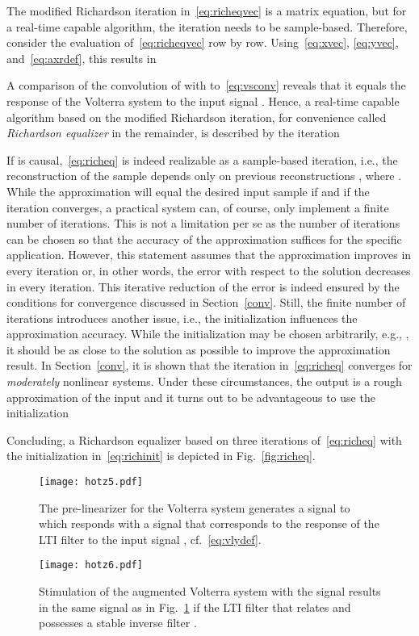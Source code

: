 \documentclass[10pt,twocolumn,twoside]{IEEEtran}
\begin{document}
The modified Richardson iteration in~\eqref{eq:richeqvec} is a matrix equation, but
for a real-time capable algorithm, the iteration needs to be sample-based. Therefore,
consider the evaluation of~\eqref{eq:richeqvec} row by row. Using~\eqref{eq:xvec},
\eqref{eq:yvec}, and~\eqref{eq:axrdef}, this results in

A comparison of the convolution of  with  to~\eqref{eq:vsconv}
reveals that it equals the response of the Volterra system  to the
input signal . Hence, a real-time capable algorithm based on the modified Richardson iteration,
for convenience called \emph{Richardson equalizer} in the remainder, is described by the
iteration

If  is causal,~\eqref{eq:richeq} is indeed realizable as a sample-based iteration,
i.e., the reconstruction  of the sample  depends only on previous
reconstructions , where . 
While the approximation  will equal the desired input sample 
if  and if the iteration converges,
a practical system can, of course, only implement a finite number of iterations.
This is not a limitation per se as the number of iterations can be
chosen so that the accuracy of the approximation suffices for the specific application.
However, this statement assumes that the approximation improves in every iteration or,
in other words, the error with respect to the solution decreases in every iteration.
This iterative reduction of the error is indeed ensured by the conditions for
convergence discussed in Section~\ref{conv}.
Still, the finite number of iterations introduces another issue, i.e.,
the initialization  influences the approximation accuracy.
While the initialization may be chosen arbitrarily, e.g., ,
it should be as close to the solution  as possible to improve the approximation result.
In Section~\ref{conv}, it is shown that the iteration in~\eqref{eq:richeq} converges
for \emph{moderately} nonlinear systems.
Under these circumstances, the output is a rough approximation of the input and
it turns out to be advantageous to use the initialization

Concluding, a Richardson equalizer based on three iterations of~\eqref{eq:richeq}
with the initialization in~\eqref{eq:richinit} is depicted in Fig.~\ref{fig:richeq}.

\begin{figure}[!t]
	\centering
	\texttt{[image: hotz5.pdf]}
	\caption{The pre-linearizer for the Volterra system 
		generates a signal  to which  responds with a signal 
		that corresponds to the response of the
		LTI filter  to the input signal , cf.~\eqref{eq:vlydef}.}
	\label{fig:hnprelin:a}
\end{figure}
\begin{figure}[!t]
	\centering
	\texttt{[image: hotz6.pdf]}
	\caption{Stimulation of the augmented Volterra system  with the signal 
		results in the same signal  as in Fig.~\ref{fig:hnprelin:a} if the LTI
		filter  that relates  and  possesses a stable inverse filter .}
	\label{fig:prelinaltsys}
\end{figure}
\end{document}
